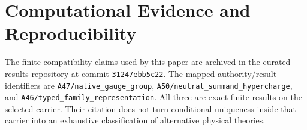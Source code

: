 \documentclass[11pt]{article}
\begin{document}
\section*{Computational Evidence and Reproducibility}
The finite compatibility claims used by this paper are archived in the
\href{https://github.com/PeterNero/mtt-results-repro/tree/31247ebb5c22f3fbb5443024365433c6ee0bff4a}
{curated results repository at commit \texttt{31247ebb5c22}}.
The mapped authority/result identifiers are
\nolinkurl{A47/native_gauge_group},
\nolinkurl{A50/neutral_summand_hypercharge}, and
\nolinkurl{A46/typed_family_representation}.
All three are exact finite results on the selected carrier.  Their citation
does not turn conditional uniqueness inside that carrier into an exhaustive
classification of alternative physical theories.
\end{document}
